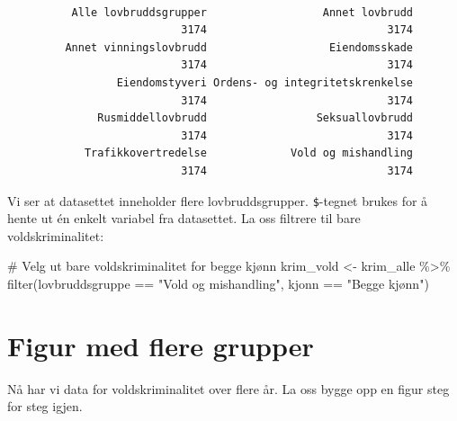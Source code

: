 \documentclass[
  norsk,
  letterpaper,
  DIV=11,
  numbers=noendperiod]{scrreprt}
\newenvironment{Shaded}{\begin{snugshade}}{\end{snugshade}}
\newcommand{\CommentTok}[1]{\textcolor[rgb]{0.37,0.37,0.37}{#1}}
\newcommand{\FunctionTok}[1]{\textcolor[rgb]{0.28,0.35,0.67}{#1}}
\newcommand{\NormalTok}[1]{\textcolor[rgb]{0.00,0.23,0.31}{#1}}
\newcommand{\OtherTok}[1]{\textcolor[rgb]{0.00,0.23,0.31}{#1}}
\newcommand{\SpecialCharTok}[1]{\textcolor[rgb]{0.37,0.37,0.37}{#1}}
\newcommand{\StringTok}[1]{\textcolor[rgb]{0.13,0.47,0.30}{#1}}
\theoremstyle{definition}
\theoremstyle{remark}
\begin{document}
\begin{Shaded}
\end{Shaded}

\begin{verbatim}

          Alle lovbruddsgrupper                  Annet lovbrudd 
                           3174                            3174 
         Annet vinningslovbrudd                   Eiendomsskade 
                           3174                            3174 
                 Eiendomstyveri Ordens- og integritetskrenkelse 
                           3174                            3174 
              Rusmiddellovbrudd                 Seksuallovbrudd 
                           3174                            3174 
            Trafikkovertredelse             Vold og mishandling 
                           3174                            3174 
\end{verbatim}

Vi ser at datasettet inneholder flere lovbruddsgrupper.
\texttt{\$}-tegnet brukes for å hente ut én enkelt variabel fra
datasettet. La oss filtrere til bare voldskriminalitet:

\begin{Shaded}
\begin{Highlighting}[]
\CommentTok{\# Velg ut bare voldskriminalitet for begge kjønn}
\NormalTok{krim\_vold }\OtherTok{\textless{}{-}}\NormalTok{ krim\_alle }\SpecialCharTok{\%\textgreater{}\%}
  \FunctionTok{filter}\NormalTok{(lovbruddsgruppe }\SpecialCharTok{==} \StringTok{"Vold og mishandling"}\NormalTok{,}
\NormalTok{         kjonn }\SpecialCharTok{==} \StringTok{"Begge kjønn"}\NormalTok{)}
\end{Highlighting}
\end{Shaded}

\section{Figur med flere grupper}\label{figur-med-flere-grupper}

Nå har vi data for voldskriminalitet over flere år. La oss bygge opp en
figur steg for steg igjen.
\end{document}
